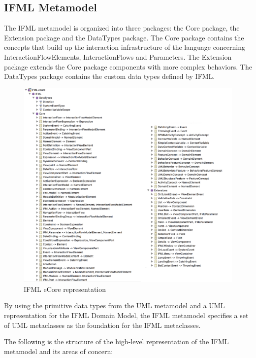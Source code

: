 \subsection{IFML Metamodel}

The IFML metamodel is organized into three packages: the Core package, the Extension package and the DataTypes package. The Core package contains the concepts that build up the interaction infrastructure of the language concerning InteractionFlowElements, InteractionFlows and Parameters. The Extension package extends the Core package components with more complex behaviors. The DataTypes package contains the custom data types defined by IFML.

\vspace{0.5cm}
\begin{figure}[H]
  \centering
    \includegraphics[width=14cm]{images/diagrams/ifml-ecore.png}
  \caption{IFML eCore representation}
  \label{fig:ifml-ecore-representation}
\end{figure}
\vspace{0.5cm}

By using the primitive data types from the UML metamodel and a UML representation for the IFML Domain Model, the IFML metamodel specifies a set of UML metaclasses as the foundation for the IFML metaclasses.

The following is the structure of the high-level representation of the IFML metamodel and its areas of concern:

